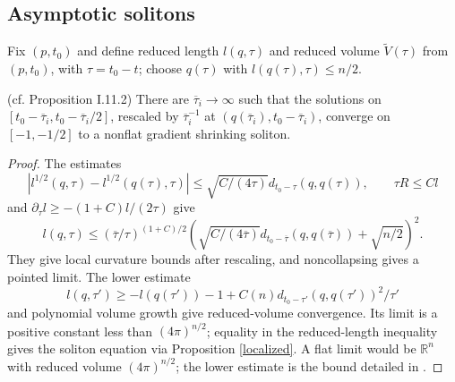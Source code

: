 \subsection{Asymptotic solitons} \label{I.11.2}
Fix $(p,t_0)$ and define reduced length $l(q,\tau)$ and reduced volume
$\widetilde V(\tau)$ from $(p,t_0)$, with $\tau=t_0-t$; choose
$q(\tau)$ with $l(q(\tau),\tau)\leq n/2$.
\begin{proposition}
\label{prop:kl-asymptotic-solitons-existence-ricci-solitons}

(cf. Proposition I.11.2) \label{asympsoliton}
There are $\overline\tau_i\to\infty$ such that the solutions on
$[t_0-\overline\tau_i,t_0-\overline\tau_i/2]$, rescaled by
$\overline\tau_i^{-1}$ at $(q(\overline\tau_i),t_0-\overline\tau_i)$,
converge on $[-1,-1/2]$ to a nonflat gradient shrinking soliton.
\end{proposition}
\begin{proof}
\sketch The estimates
\begin{equation}
 |l^{1/2}(q,\tau)-l^{1/2}(q(\tau),\tau)|
 \leq\sqrt{C/(4\tau)}d_{t_0-\tau}(q,q(\tau)),\qquad \tau R\leq Cl
\end{equation}
and $\partial_\tau l\geq-(1+C)l/(2\tau)$ give
\begin{equation}\label{upperl}
l(q,\tau)\leq(\overline\tau/\tau)^{(1+C)/2}
\left(\sqrt{C/(4\overline\tau)}d_{t_0-\overline\tau}(q,q(\overline\tau))
+\sqrt{n/2}\right)^2.
\end{equation}
They give local curvature bounds after rescaling, and noncollapsing gives a
pointed limit.  The lower estimate
\begin{equation}\label{Perelmanbound}
l(q,\tau')\geq-l(q(\tau'))-1+C(n)d_{t_0-\tau'}(q,q(\tau'))^2/\tau'
\end{equation}
and polynomial volume growth give reduced-volume convergence.  Its limit is
a positive constant less than $(4\pi)^{n/2}$; equality in the reduced-length
inequality gives the soliton equation via Proposition \ref{localized}.
A flat limit would be $\mathbb R^n$ with reduced volume $(4\pi)^{n/2}$;
the lower estimate is the bound detailed in \cite{Ye1}.
\end{proof}

